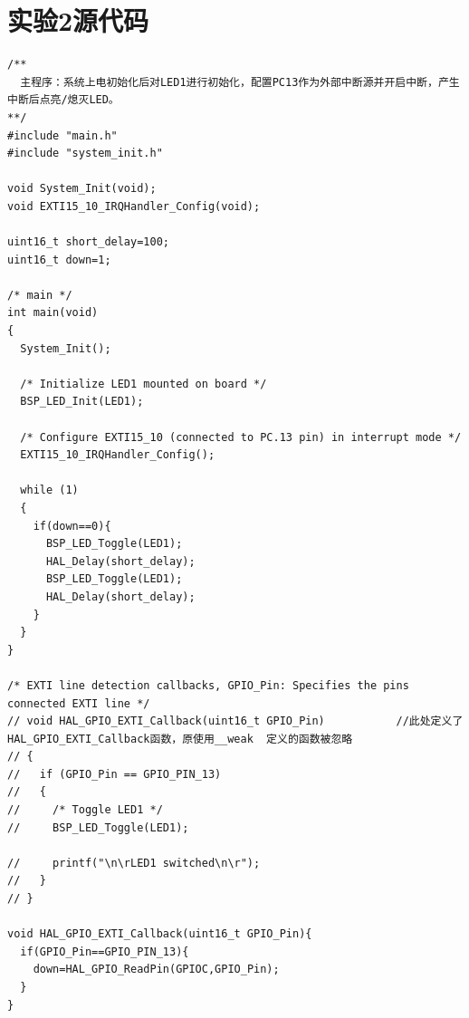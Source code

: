﻿\documentclass[UTF8,12pt]{article}
\begin{document}
\section{实验2源代码}
\begin{lstlisting}[frame=shadowbox]
/**
  主程序：系统上电初始化后对LED1进行初始化，配置PC13作为外部中断源并开启中断，产生中断后点亮/熄灭LED。
**/
#include "main.h"
#include "system_init.h"

void System_Init(void);
void EXTI15_10_IRQHandler_Config(void);

uint16_t short_delay=100;
uint16_t down=1;

/* main */
int main(void)
{
  System_Init();
  
  /* Initialize LED1 mounted on board */
  BSP_LED_Init(LED1);
  
  /* Configure EXTI15_10 (connected to PC.13 pin) in interrupt mode */
  EXTI15_10_IRQHandler_Config();
  
  while (1)
  {
    if(down==0){
      BSP_LED_Toggle(LED1);
      HAL_Delay(short_delay);
      BSP_LED_Toggle(LED1);
      HAL_Delay(short_delay);
    }
  }
}

/* EXTI line detection callbacks, GPIO_Pin: Specifies the pins connected EXTI line */
// void HAL_GPIO_EXTI_Callback(uint16_t GPIO_Pin)			//此处定义了HAL_GPIO_EXTI_Callback函数，原使用__weak  定义的函数被忽略
// {
//   if (GPIO_Pin == GPIO_PIN_13)
//   {
//     /* Toggle LED1 */
//     BSP_LED_Toggle(LED1);
    
//     printf("\n\rLED1 switched\n\r");
//   }
// }

void HAL_GPIO_EXTI_Callback(uint16_t GPIO_Pin){
  if(GPIO_Pin==GPIO_PIN_13){
    down=HAL_GPIO_ReadPin(GPIOC,GPIO_Pin);
  }
}
\end{lstlisting}
\end{document}
